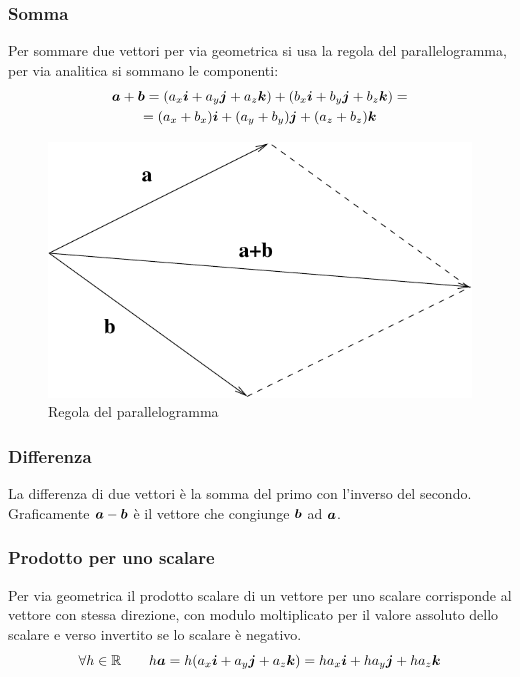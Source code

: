 \subsubsection{Somma}
Per sommare due vettori per via geometrica si usa la regola del
parallelogramma, per via analitica si sommano le componenti:
\begin{multline*}
\boldsymbol{a}+\boldsymbol{b}=(a_x\boldsymbol{i}+a_y\boldsymbol{j}+a_z \boldsymbol{k})+(b_x\boldsymbol{i}+b_y\boldsymbol{j}+b_z\boldsymbol{k})=\\
=(a_x+b_x)\boldsymbol{i}+(a_y+b_y)\boldsymbol{j}+(a_z+b_z)\boldsymbol{k}
\end{multline*}
\begin{figure}[htbp]
\centering
\includegraphics[scale=0.5]{immagini/fisica1/somma_vettori}
\caption{Regola del parallelogramma}
\end{figure}



\subsubsection{Differenza} La differenza di due
vettori è la somma del primo con l'inverso del secondo. Graficamente $\boldsymbol{a}-\boldsymbol{b}$ è il vettore che congiunge $\boldsymbol{b}$ ad $\boldsymbol{a}$.
\subsubsection{Prodotto per uno scalare}
Per via geometrica il prodotto scalare di un vettore per uno scalare corrisponde al vettore con stessa direzione, con modulo moltiplicato per il valore assoluto dello scalare e verso invertito se lo scalare è negativo.
\begin{equation*}\forall h \in \mathbb{R}\qquad h\boldsymbol{a}=h(a_x\boldsymbol{i}+a_y\boldsymbol{j}+a_z\boldsymbol{k})=ha_x\boldsymbol{i}+ha_y\boldsymbol{j}+ha_z\boldsymbol{k}\end{equation*}
